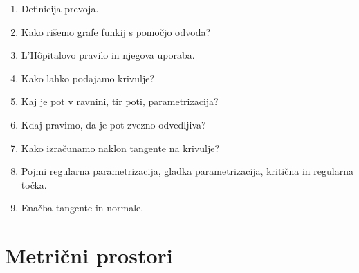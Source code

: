 \documentclass[a4paper,12pt]{report}
\begin{document}
\begin{enumerate}
    \item Definicija prevoja.
    \item Kako rišemo grafe funkij s pomočjo odvoda?
    \item L'Hôpitalovo pravilo in njegova uporaba.
    \item Kako lahko podajamo krivulje?
    \item Kaj je pot v ravnini, tir poti, parametrizacija?
    \item Kdaj pravimo, da je pot zvezno odvedljiva?
    \item Kako izračunamo naklon tangente na krivulje?
    \item Pojmi regularna parametrizacija, gladka parametrizacija, kritična in regularna točka.
    \item Enačba tangente in normale.
\end{enumerate}


% 
% 
% 
% 
% 
% 
% 
% 


\chapter{Metrični prostori}

% 
\end{document}
